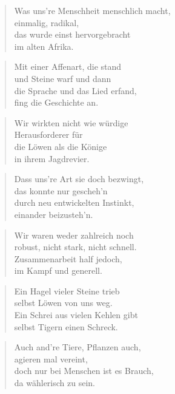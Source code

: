 \documentclass[10pt,a4paper]{article}
\begin{document}
\begin{paracol}{2}
\begin{verse}
Was uns’re Menschheit menschlich macht, \\
einmalig, radikal, \\
das wurde einst hervorgebracht \\
im alten Afrika. \\
\end{verse}

\begin{verse}
Mit einer Affenart, die stand \\
und Steine warf und dann \\
die Sprache und das Lied erfand, \\
fing die Geschichte an. \\
\end{verse}

\begin{verse}
Wir wirkten nicht wie würdige \\
Herausforderer für \\
die Löwen als die Könige \\
in ihrem Jagdrevier. \\
\end{verse}

\begin{verse}
Dass uns’re Art sie doch bezwingt, \\
das konnte nur gescheh’n \\
durch neu entwickelten Instinkt, \\
einander beizusteh’n. \\
\end{verse}

\begin{verse}
Wir waren weder zahlreich noch \\
robust, nicht stark, nicht schnell. \\
Zusammenarbeit half jedoch, \\
im Kampf und generell. \\
\end{verse}

\begin{verse}
Ein Hagel vieler Steine trieb \\
selbst Löwen von uns weg. \\
Ein Schrei aus vielen Kehlen gibt \\
selbst Tigern einen Schreck. \\
\end{verse}

\begin{verse}
Auch and’re Tiere, Pflanzen auch, \\
agieren mal vereint, \\
doch nur bei Menschen ist es Brauch, \\
da wählerisch zu sein. \\
\end{verse}


\end{paracol}
\end{document}
